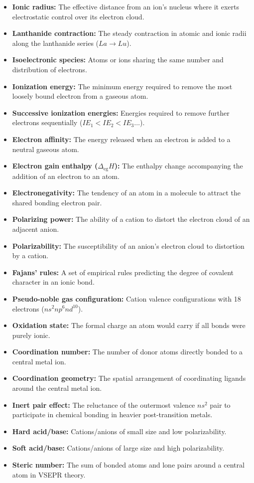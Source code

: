 \documentclass[12pt,a4paper]{article}
\begin{document}
\begin{tcolorbox}[defbox, title={One-Line Definitions}]
\begin{itemize}[leftmargin=*, itemsep=2.pt, topsep=2pt]
  \item \textbf{Ionic radius:} The effective distance from an ion's nucleus where it exerts electrostatic control over its electron cloud.
  \item \textbf{Lanthanide contraction:} The steady contraction in atomic and ionic radii along the lanthanide series ($La \to Lu$).
  \item \textbf{Isoelectronic species:} Atoms or ions sharing the same number and distribution of electrons.
  \item \textbf{Ionization energy:} The minimum energy required to remove the most loosely bound electron from a gaseous atom.
  \item \textbf{Successive ionization energies:} Energies required to remove further electrons sequentially ($IE_1 < IE_2 < IE_3 \dots$).
  \item \textbf{Electron affinity:} The energy released when an electron is added to a neutral gaseous atom.
  \item \textbf{Electron gain enthalpy ($\Delta_{\text{eg}}H$):} The enthalpy change accompanying the addition of an electron to an atom.
  \item \textbf{Electronegativity:} The tendency of an atom in a molecule to attract the shared bonding electron pair.
  \item \textbf{Polarizing power:} The ability of a cation to distort the electron cloud of an adjacent anion.
  \item \textbf{Polarizability:} The susceptibility of an anion's electron cloud to distortion by a cation.
  \item \textbf{Fajans' rules:} A set of empirical rules predicting the degree of covalent character in an ionic bond.
  \item \textbf{Pseudo-noble gas configuration:} Cation valence configurations with 18 electrons ($ns^2 np^6 nd^{10}$).
  \item \textbf{Oxidation state:} The formal charge an atom would carry if all bonds were purely ionic.
  \item \textbf{Coordination number:} The number of donor atoms directly bonded to a central metal ion.
  \item \textbf{Coordination geometry:} The spatial arrangement of coordinating ligands around the central metal ion.
  \item \textbf{Inert pair effect:} The reluctance of the outermost valence $ns^2$ pair to participate in chemical bonding in heavier post-transition metals.
  \item \textbf{Hard acid/base:} Cations/anions of small size and low polarizability.
  \item \textbf{Soft acid/base:} Cations/anions of large size and high polarizability.
  \item \textbf{Steric number:} The sum of bonded atoms and lone pairs around a central atom in VSEPR theory.
\end{itemize}
\end{tcolorbox}
\end{document}
